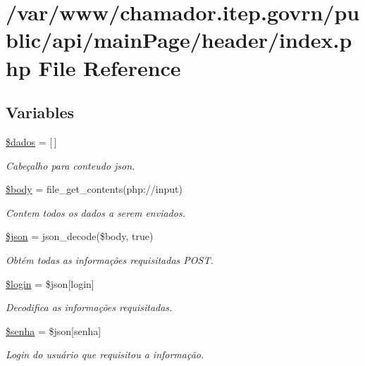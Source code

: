 \hypertarget{main_page_2header_2index_8php}{}\section{/var/www/chamador.itep.\+govrn/public/api/main\+Page/header/index.php File Reference}
\label{main_page_2header_2index_8php}
\subsection*{Variables}
\begin{DoxyCompactItemize}
\item 
\hyperlink{main_page_2header_2index_8php_a252370d95039a38fa11afab784725d58}{\$dados} = \mbox{[}$\,$\mbox{]}
\begin{DoxyCompactList}\small\item\em Cabeçalho para conteudo json. \end{DoxyCompactList}\item 
\hyperlink{main_page_2header_2index_8php_a26b9f9373f7bb79dfcf8a86dff086b45}{\$body} = file\+\_\+get\+\_\+contents(\textquotesingle{}php\+://input\textquotesingle{})
\begin{DoxyCompactList}\small\item\em Contem todos os dados a serem enviados. \end{DoxyCompactList}\item 
\hyperlink{main_page_2header_2index_8php_acedd13b51401130848ce18f4d5c52605}{\$json} = json\+\_\+decode(\$body, true)
\begin{DoxyCompactList}\small\item\em Obtém todas as informações requisitadas P\+O\+ST. \end{DoxyCompactList}\item 
\hyperlink{main_page_2header_2index_8php_afc31993e855f9631572adfedcfe6f34b}{\$login} = \$json\mbox{[}\textquotesingle{}login\textquotesingle{}\mbox{]}
\begin{DoxyCompactList}\small\item\em Decodifica as informações requisitadas. \end{DoxyCompactList}\item 
\hyperlink{main_page_2header_2index_8php_a3678c8769c9698fd30581c1016c5f475}{\$senha} = \$json\mbox{[}\textquotesingle{}senha\textquotesingle{}\mbox{]}
\begin{DoxyCompactList}\small\item\em Login do usuário que requisitou a informação. \end{DoxyCompactList}\item 

\end{DoxyCompactItemize}
